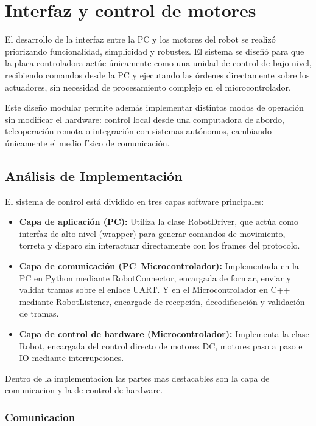 \section{Interfaz y control de motores}

El desarrollo de la interfaz entre la PC y los motores del robot se realizó priorizando funcionalidad, simplicidad y robustez. El sistema se diseñó para que la placa controladora actúe únicamente como una unidad de control de bajo nivel, recibiendo comandos desde la PC y ejecutando las órdenes directamente sobre los actuadores, sin necesidad de procesamiento complejo en el microcontrolador.

Este diseño modular permite además implementar distintos modos de operación sin modificar el hardware: control local desde una computadora de abordo, teleoperación remota o integración con sistemas autónomos, cambiando únicamente el medio físico de comunicación.

\subsection{Análisis de Implementación}
El sistema de control está dividido en tres capas software principales:

\begin{itemize}
    \item \textbf{Capa de aplicación (PC):}
Utiliza la clase RobotDriver, que actúa como interfaz de alto nivel (wrapper) para generar comandos de movimiento, torreta y disparo sin interactuar directamente con los frames del protocolo.

    \item \textbf{Capa de comunicación (PC–Microcontrolador):}  
Implementada en la PC en Python mediante RobotConnector, encargada de formar, enviar y validar tramas sobre el enlace UART. Y en el Microcontrolador en C++ mediante RobotListener, encargade de recepción, decodificación y validación de tramas.

    \item \textbf{Capa de control de hardware (Microcontrolador):}
Implementa la clase Robot, encargada del control directo de motores DC, motores paso a paso e IO mediante interrupciones.
\end{itemize}


Dentro de la implementacion las partes mas destacables son la capa de comunicacion y la de control de hardware.

\subsubsection{Comunicacion}

